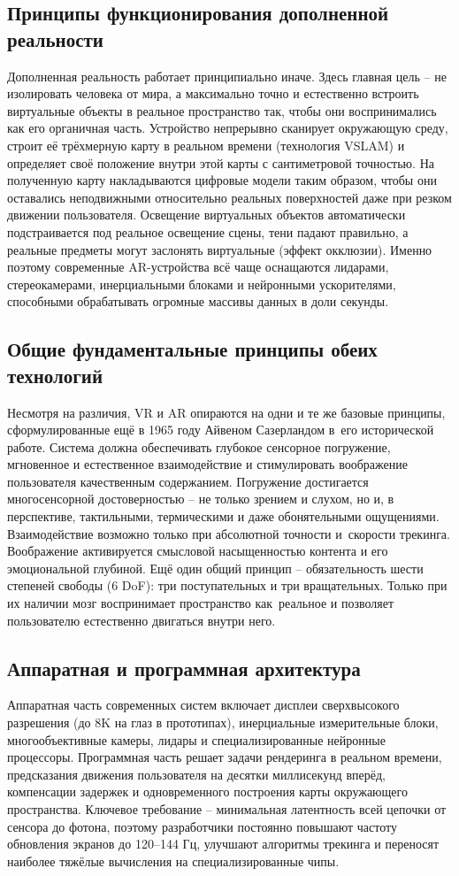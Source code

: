 \documentclass{ou}
\begin{document}
\subsection{Принципы функционирования дополненной реальности}
Дополненная реальность работает принципиально иначе. Здесь главная цель -- не изолировать человека от мира, а максимально точно и естественно встроить виртуальные объекты в реальное пространство так, чтобы они воспринимались как его органичная часть. Устройство непрерывно сканирует окружающую среду, строит её трёхмерную карту в реальном времени (технология VSLAM) и определяет своё положение внутри этой карты с сантиметровой точностью. На полученную карту накладываются цифровые модели таким образом, чтобы они оставались неподвижными относительно реальных поверхностей даже при резком движении пользователя. Освещение виртуальных объектов автоматически подстраивается под реальное освещение сцены, тени падают правильно, а реальные предметы могут заслонять виртуальные (эффект окклюзии). Именно поэтому современные AR-устройства всё чаще оснащаются лидарами, стереокамерами, инерциальными блоками и нейронными ускорителями, способными обрабатывать огромные массивы данных в доли секунды.
\subsection{Общие фундаментальные принципы обеих технологий}
Несмотря на различия, VR и AR опираются на одни и те же базовые принципы, сформулированные ещё в 1965 году Айвеном Сазерландом в~его исторической работе. Система должна обеспечивать глубокое сенсорное погружение, мгновенное и естественное взаимодействие и стимулировать воображение пользователя качественным содержанием. Погружение достигается многосенсорной достоверностью -- не только зрением и слухом, но и, в перспективе, тактильными, термическими и даже обонятельными ощущениями. Взаимодействие возможно только при абсолютной точности и~скорости трекинга. Воображение активируется смысловой насыщенностью контента и его эмоциональной глубиной. Ещё один общий принцип -- обязательность шести степеней свободы (6 DoF): три поступательных и три вращательных. Только при их наличии мозг воспринимает пространство как~реальное и позволяет пользователю естественно двигаться внутри него.
\subsection{Аппаратная и программная архитектура}
Аппаратная часть современных систем включает дисплеи сверхвысокого разрешения (до 8K на глаз в прототипах), инерциальные измерительные блоки, многообъективные камеры, лидары и специализированные нейронные процессоры. Программная часть решает задачи рендеринга в реальном времени, предсказания движения пользователя на десятки миллисекунд вперёд, компенсации задержек и одновременного построения карты окружающего пространства. Ключевое требование -- минимальная латентность всей цепочки от сенсора до фотона, поэтому разработчики постоянно повышают частоту обновления экранов до 120–144 Гц, улучшают алгоритмы трекинга и переносят наиболее тяжёлые вычисления на специализированные чипы.
\end{document}
